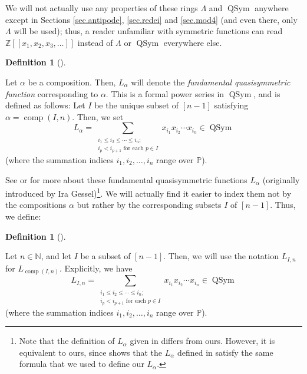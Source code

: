 \documentclass[numbers=enddot,12pt,final,onecolumn,notitlepage]{scrartcl}%
\numberwithin{exer}{section}
\theoremstyle{definition}
\newtheorem{defi}[theo]{Definition}
\newenvironment{definition}[1][]
{\begin{defi}[#1]\begin{leftbar}}
{\end{leftbar}\end{defi}}
\let\sumnonlimits\sum
\renewcommand{\sum}{\sumnonlimits\limits}
\begin{document}
We will not actually use any properties of these rings $\Lambda$ and
$\operatorname*{QSym}$ anywhere except in Sections \ref{sec.antipode},
\ref{sec.redei} and \ref{sec.mod4} (and even there, only $\Lambda$ will be
used); thus, a reader unfamiliar with symmetric functions can read
$\mathbb{Z}\left[  \left[  x_{1},x_{2},x_{3},\ldots\right]  \right]  $ instead
of $\Lambda$ or $\operatorname*{QSym}$ everywhere else.

\begin{definition}
Let $\alpha$ be a composition. Then, $L_{\alpha}$ will denote the
\emph{fundamental quasisymmetric function} corresponding to $\alpha$. This is
a formal power series in $\operatorname*{QSym}$, and is defined as follows:
Let $I$ be the unique subset of $\left[  n-1\right]  $ satisfying
$\alpha=\operatorname*{comp}\left(  I,n\right)  $. Then, we set%
\[
L_{\alpha}=\sum_{\substack{i_{1}\leq i_{2}\leq\cdots\leq i_{n};\\i_{p}%
<i_{p+1}\text{ for each }p\in I}}x_{i_{1}}x_{i_{2}}\cdots x_{i_{n}}%
\in\operatorname*{QSym}%
\]
(where the summation indices $i_{1},i_{2},\ldots,i_{n}$ range over
$\mathbb{P}$).
\end{definition}

See \cite[\S 7.19]{EC2} or \cite[\S 5]{GriRei} for more about these
fundamental quasisymmetric functions $L_{\alpha}$ (originally introduced by
Ira Gessel)\footnote{Note that the definition of $L_{\alpha}$ given in
\cite[Definition 5.2.4]{GriRei} differs from ours. However, it is equivalent
to ours, since \cite[Proposition 5.2.9]{GriRei} shows that the $L_{\alpha}$
defined in \cite[Definition 5.2.4]{GriRei} satisfy the same formula that we
used to define our $L_{\alpha}$.}. We will actually find it easier to index
them not by the compositions $\alpha$ but rather by the corresponding subsets
$I$ of $\left[  n-1\right]  $. Thus, we define:

\begin{definition}
Let $n\in\mathbb{N}$, and let $I$ be a subset of $\left[  n-1\right]  $. Then,
we will use the notation $L_{I,n}$ for $L_{\operatorname*{comp}\left(
I,n\right)  }$. Explicitly, we have%
\begin{equation}
L_{I,n}=\sum_{\substack{i_{1}\leq i_{2}\leq\cdots\leq i_{n};\\i_{p}%
<i_{p+1}\text{ for each }p\in I}}x_{i_{1}}x_{i_{2}}\cdots x_{i_{n}}%
\in\operatorname*{QSym} \label{eq.def.Lal.LIn}%
\end{equation}
(where the summation indices $i_{1},i_{2},\ldots,i_{n}$ range over
$\mathbb{P}$).
\end{definition}
\end{document}
